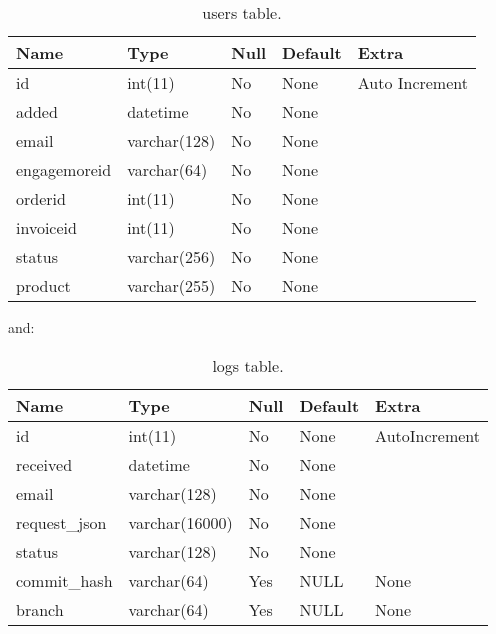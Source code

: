 \documentclass[final,letterpaper,12pt]{article}
\begin{document}
\begin{table}[ht]
\begin{tabular}{|l|l|l|l|l|}
\hline
Name&Type&Null&Default&Extra\\ \hline
id&int(11)&No&None&Auto Increment\\
added&datetime&No&None&\\
email&varchar(128)&No&None&\\
engagemoreid&varchar(64)&No&None&\\
orderid&int(11)&No&None&\\
invoiceid&int(11)&No&None&\\
status&varchar(256)&No&None&\\
product&varchar(255)&No&None&\\
\hline
\end{tabular}
\caption{\label{tab:users}users table.}
\end{table}

\newpage
\noindent and:
\begin{table}[ht]
\begin{tabular}{|l|l|l|l|l|}
\hline
Name&Type&Null&Default&Extra\\ \hline
id&int(11)&No&None&AutoIncrement\\
received&datetime&No&None&\\
email&varchar(128)&No&None&\\
request\_json&varchar(16000)&No&None&\\
status&varchar(128)&No&None&\\
commit\_hash&varchar(64)&Yes&NULL&None\\
branch&varchar(64)&Yes&NULL&None\\
\hline
\end{tabular}
\caption{\label{tab:logs}logs table.}
\end{table}
\end{document}
